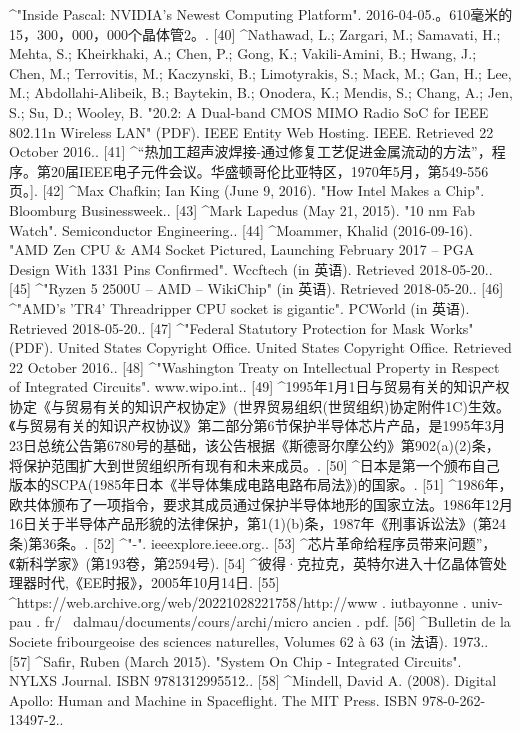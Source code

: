 \begin{enumerate}
^"Inside Pascal: NVIDIA's Newest Computing Platform". 2016-04-05.。610毫米的15，300，000，000个晶体管2。.
[40]
^Nathawad, L.; Zargari, M.; Samavati, H.; Mehta, S.; Kheirkhaki, A.; Chen, P.; Gong, K.; Vakili-Amini, B.; Hwang, J.; Chen, M.; Terrovitis, M.; Kaczynski, B.; Limotyrakis, S.; Mack, M.; Gan, H.; Lee, M.; Abdollahi-Alibeik, B.; Baytekin, B.; Onodera, K.; Mendis, S.; Chang, A.; Jen, S.; Su, D.; Wooley, B. "20.2: A Dual-band CMOS MIMO Radio SoC for IEEE 802.11n Wireless LAN" (PDF). IEEE Entity Web Hosting. IEEE. Retrieved 22 October 2016..
[41]
^“热加工超声波焊接-通过修复工艺促进金属流动的方法”，程序。第20届IEEE电子元件会议。华盛顿哥伦比亚特区，1970年5月，第549-556页。].
[42]
^Max Chafkin; Ian King (June 9, 2016). "How Intel Makes a Chip". Bloomburg Businessweek..
[43]
^Mark Lapedus (May 21, 2015). "10 nm Fab Watch". Semiconductor Engineering..
[44]
^Moammer, Khalid (2016-09-16). "AMD Zen CPU & AM4 Socket Pictured, Launching February 2017 – PGA Design With 1331 Pins Confirmed". Wccftech (in 英语). Retrieved 2018-05-20..
[45]
^"Ryzen 5 2500U – AMD – WikiChip" (in 英语). Retrieved 2018-05-20..
[46]
^"AMD's 'TR4' Threadripper CPU socket is gigantic". PCWorld (in 英语). Retrieved 2018-05-20..
[47]
^"Federal Statutory Protection for Mask Works" (PDF). United States Copyright Office. United States Copyright Office. Retrieved 22 October 2016..
[48]
^"Washington Treaty on Intellectual Property in Respect of Integrated Circuits". www.wipo.int..
[49]
^1995年1月1日与贸易有关的知识产权协定《与贸易有关的知识产权协定》(世界贸易组织(世贸组织)协定附件1C)生效。《与贸易有关的知识产权协议》第二部分第6节保护半导体芯片产品，是1995年3月23日总统公告第6780号的基础，该公告根据《斯德哥尔摩公约》第902(a)(2)条，将保护范围扩大到世贸组织所有现有和未来成员。.
[50]
^日本是第一个颁布自己版本的SCPA(1985年日本《半导体集成电路电路布局法》)的国家。.
[51]
^1986年，欧共体颁布了一项指令，要求其成员通过保护半导体地形的国家立法。1986年12月16日关于半导体产品形貌的法律保护，第1(1)(b)条，1987年《刑事诉讼法》(第24条)第36条。.
[52]
^"-". ieeexplore.ieee.org..
[53]
^芯片革命给程序员带来问题”，《新科学家》(第193卷，第2594号).
[54]
^彼得·克拉克，英特尔进入十亿晶体管处理器时代,《EE时报》，2005年10月14日.
[55]
^https://web.archive.org/web/20221028221758/http://www . iutbayonne . univ-pau . fr/~ dalmau/documents/cours/archi/micro ancien . pdf.
[56]
^Bulletin de la Societe fribourgeoise des sciences naturelles, Volumes 62 à 63 (in 法语). 1973..
[57]
^Safir, Ruben (March 2015). "System On Chip - Integrated Circuits". NYLXS Journal. ISBN 9781312995512..
[58]
^Mindell, David A. (2008). Digital Apollo: Human and Machine in Spaceflight. The MIT Press. ISBN 978-0-262-13497-2..

\end{enumerate}
